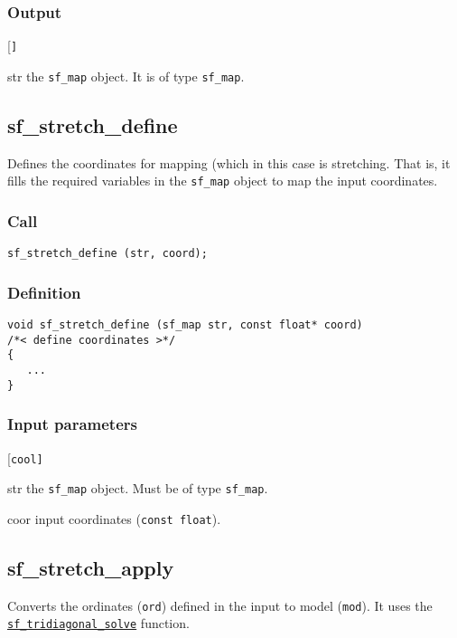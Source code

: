\subsubsection*{Output}
\begin{desclist}{\tt }{\quad}[\tt ]
   \setlength\itemsep{0pt}
   \item[str] the \texttt{sf\_map} object. It is of type \texttt{sf\_map}.
\end{desclist}




\subsection{{sf\_stretch\_define}}
Defines the coordinates for mapping (which in this case is stretching. That is, it fills the required variables in the \texttt{sf\_map} object to map the input coordinates.


\subsubsection*{Call}
\begin{verbatim}sf_stretch_define (str, coord);\end{verbatim}

\subsubsection*{Definition}
\begin{verbatim}
void sf_stretch_define (sf_map str, const float* coord)
/*< define coordinates >*/
{
   ...
}
\end{verbatim}

\subsubsection*{Input parameters}
\begin{desclist}{\tt }{\quad}[\tt cool]
   \setlength\itemsep{0pt}
   \item[str] the \texttt{sf\_map} object. Must be of type \texttt{sf\_map}. 
   \item[coor] input coordinates (\texttt{const float}).
\end{desclist}




\subsection{{sf\_stretch\_apply}}\label{sec:sf_stretch_apply}
Converts the ordinates (\texttt{ord}) defined in the input to model (\texttt{mod}). It uses the \hyperref[sec:sf_tridiagonal_solve]{\texttt{sf\_tridiagonal\_solve}} function.

